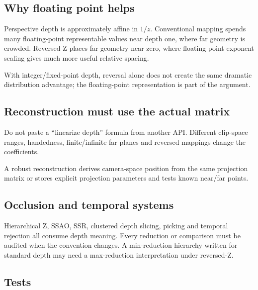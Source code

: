 \subsection{Why floating point helps}\label{appendix-275ec8847057-why-floating-point-helps}

\hypertarget{appendix-275ec8847057-why-floating-point-helps}{}

Perspective depth is approximately affine in \(1/z\). Conventional mapping spends many floating-point representable values near depth one, where far geometry is crowded. Reversed-Z places far geometry near zero, where floating-point exponent scaling gives much more useful relative spacing.

With integer/fixed-point depth, reversal alone does not create the same dramatic distribution advantage; the floating-point representation is part of the argument.

\subsection{Reconstruction must use the actual matrix}\label{appendix-275ec8847057-reconstruction-must-use-the-actual-matrix}

\hypertarget{appendix-275ec8847057-reconstruction-must-use-the-actual-matrix}{}

Do not paste a ``linearize depth'' formula from another API. Different clip-space ranges, handedness, finite/infinite far planes and reversed mappings change the coefficients.

A robust reconstruction derives camera-space position from the same projection matrix or stores explicit projection parameters and tests known near/far points.

\subsection{Occlusion and temporal systems}\label{appendix-275ec8847057-occlusion-and-temporal-systems}

\hypertarget{appendix-275ec8847057-occlusion-and-temporal-systems}{}

Hierarchical Z, SSAO, SSR, clustered depth slicing, picking and temporal rejection all consume depth meaning. Every reduction or comparison must be audited when the convention changes. A min-reduction hierarchy written for standard depth may need a max-reduction interpretation under reversed-Z.

\subsection{Tests}\label{appendix-275ec8847057-tests}

